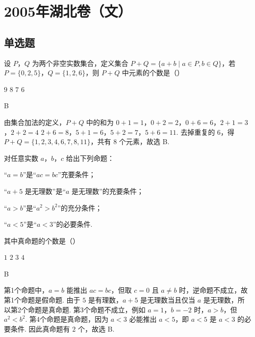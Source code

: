 \chapter{2005年湖北卷（文）}
\section{单选题}
\begin{problem}
设 \(P\)，\(Q\) 为两个非空实数集合，定义集合 \(P + Q = \{a + b \mid a \in P, b \in Q\}\)，若 \(P = \{0, 2, 5\}\)，\(Q = \{1, 2, 6\}\)，则 \(P + Q\) 中元素的个数是（\quad）

\choices
    {\(9\)}
    {\(8\)}
    {\(7\)}
    {\(6\)}
\end{problem}

\begin{answer}
B
\end{answer}

\begin{solution}
由集合加法的定义，\(P+Q\) 中的和为
\(0+1=1\)，\(0+2=2\)，\(0+6=6\)，\(2+1=3\)，\(2+2=4\)
\(2+6=8\)，\(5+1=6\)，\(5+2=7\)，\(5+6=11\).
去掉重复的 \(6\)，得 \(P+Q=\{1,2,3,4,6,7,8,11\}\)，共有 \(8\) 个元素，故选 B.
\end{solution}

\begin{problem}
对任意实数 \(a\)，\(b\)，\(c\) 给出下列命题：

\begin{circlelist}
\item “\(a = b\)”是“\(ac = bc\)”充要条件；
\item “\(a + 5\) 是无理数”是“\(a\) 是无理数”的充要条件；
\item “\(a > b\)”是“\(a^{2} > b^{2}\)”的充分条件；
\item “\(a < 5\)”是“\(a < 3\)”的必要条件.
\end{circlelist}

其中真命题的个数是（\quad）

\choices
    {\(1\)}
    {\(2\)}
    {\(3\)}
    {\(4\)}
\end{problem}

\begin{answer}
B
\end{answer}

\begin{solution}
第1个命题中，\(a=b\) 能推出 \(ac=bc\)，但取 \(c=0\) 且 \(a\ne b\) 时，逆命题不成立，故第1个命题是假命题. 由于 \(5\) 是有理数，\(a+5\) 是无理数当且仅当 \(a\) 是无理数，所以第2个命题是真命题. 第3个命题不成立，例如 \(a=1\)，\(b=-2\) 时，\(a>b\)，但 \(a^2<b^2\). 第4个命题是真命题，因为 \(a<3\) 必能推出 \(a<5\)，即 \(a<5\) 是 \(a<3\) 的必要条件. 因此真命题有 \(2\) 个，故选 B.
\end{solution}

